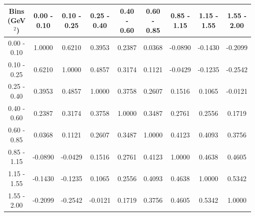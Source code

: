 \documentclass[aps, prd, reprint,showpacs,  preprintnumbers,amsmath,amssymb,superscriptaddress, nofootinbib]{revtex4-1}
\makeatletter
\renewenvironment{table}
  {\def\@captype{table}}
  {}
\makeatother
\begin{document}
\begin{table}
\centering
\begin{tabular}{ccccccccc}
\hline
Bins (GeV$^{2}$) &  0.00 - 0.10 &  0.10 - 0.25 &  0.25 - 0.40 &  0.40 - 0.60 &  0.60 - 0.85 &  0.85 - 1.15 &  1.15 - 1.55 &  1.55 - 2.00 \\ 
\hline
  0.00 -  0.10  & 1.0000  & 0.6210  & 0.3953  & 0.2387  & 0.0368  &-0.0890  &-0.1430  &-0.2099 \\
  0.10 -  0.25  & 0.6210  & 1.0000  & 0.4857  & 0.3174  & 0.1121  &-0.0429  &-0.1235  &-0.2542 \\
  0.25 -  0.40  & 0.3953  & 0.4857  & 1.0000  & 0.3758  & 0.2607  & 0.1516  & 0.1065  &-0.0121 \\
  0.40 -  0.60  & 0.2387  & 0.3174  & 0.3758  & 1.0000  & 0.3487  & 0.2761  & 0.2556  & 0.1719 \\
  0.60 -  0.85  & 0.0368  & 0.1121  & 0.2607  & 0.3487  & 1.0000  & 0.4123  & 0.4093  & 0.3756 \\
  0.85 -  1.15  &-0.0890  &-0.0429  & 0.1516  & 0.2761  & 0.4123  & 1.0000  & 0.4638  & 0.4605 \\
  1.15 -  1.55  &-0.1430  &-0.1235  & 0.1065  & 0.2556  & 0.4093  & 0.4638  & 1.0000  & 0.5342 \\
  1.55 -  2.00  &-0.2099  &-0.2542  &-0.0121  & 0.1719  & 0.3756  & 0.4605  & 0.5342  & 1.0000 \\
\hline
\hline
\end{tabular}
\caption{Correlation matrix for bins of $d\sigma/dQ^2$.}
\label{tb:piz-Q2-cov}
\end{table}

\vspace{0.3cm}
\end{document}
